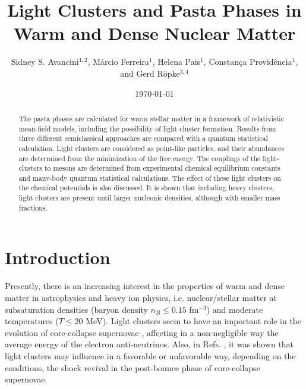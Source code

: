 \documentclass[aps,prc,nofootinbib,twocolumn,showpacs]{revtex4-1}
\begin{document}
\title{Light Clusters and Pasta Phases in Warm and Dense Nuclear Matter} 


\author{Sidney S. Avancini$^{1,2}$, M\'arcio Ferreira$^1$, Helena Pais$^1$, Constan\c ca
Provid\^encia$^1$, and Gerd R\"opke$^{3,4}$}

\date{\today}

\begin{abstract}
The pasta phases are calculated for warm  stellar matter  in a framework of relativistic mean-field  models, including the possibility of light cluster formation. Results from three
  different semiclassical approaches are compared with a quantum statistical calculation. Light clusters are considered
as point-like particles, and their abundances are determined from the
minimization of the free energy. The couplings of the light-clusters
to mesons are determined from experimental chemical equilibrium
constants and many-body quantum statistical calculations. The effect of these light clusters on the chemical potentials is also discussed. It is shown that including heavy clusters, light clusters are present until larger nucleonic densities, although with smaller mass fractions.


\end{abstract}





\maketitle

\section{Introduction}

Presently, there is an increasing interest in the properties of warm and
dense matter in astrophysics and heavy ion physics,
i.e. nuclear/stellar matter at subsaturation densities (baryon density
$n_B \leq 0.15$ fm$^{-3}$) and moderate temperatures ($T \leq 20$
MeV). Light clusters seem to have an important role in the evolution
of core-collapse supernovae \cite{arcones08}, affecting in a non-negligible way the average energy of the electron anti-neutrinos. Also, in Refs. \cite{furusawa13,furusawa16}, it was shown that light clusters may influence in
a favorable or unfavorable way, depending on the conditions, the shock
revival in the  post-bounce phase of core-collapse supernovae.
\end{document}
